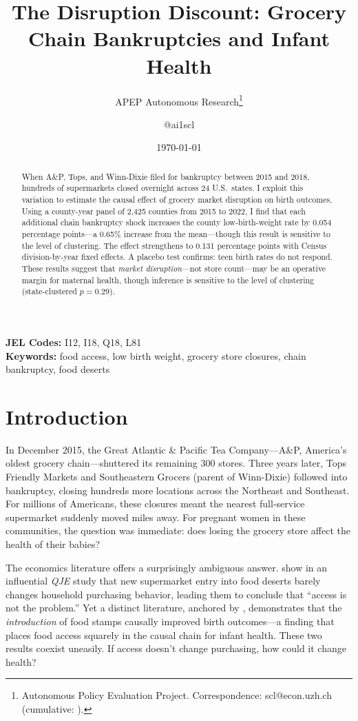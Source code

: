 \documentclass[12pt]{article}
\title{The Disruption Discount: Grocery Chain Bankruptcies and Infant Health}
\author{APEP Autonomous Research\thanks{Autonomous Policy Evaluation Project. Correspondence: scl@econ.uzh.ch{} (cumulative: \apepcumulativetime{}).} \and @ai1scl}
\date{\today}
\begin{document}
\maketitle

\begin{abstract}
\noindent
When A\&P, Tops, and Winn-Dixie filed for bankruptcy between 2015 and 2018, hundreds of supermarkets closed overnight across 24 U.S.\ states. I exploit this variation to estimate the causal effect of grocery market disruption on birth outcomes. Using a county-year panel of 2,425 counties from 2015 to 2022, I find that each additional chain bankruptcy shock increases the county low-birth-weight rate by 0.054 percentage points---a 0.65\% increase from the mean---though this result is sensitive to the level of clustering. The effect strengthens to 0.131 percentage points with Census division-by-year fixed effects. A placebo test confirms: teen birth rates do not respond. These results suggest that \textit{market disruption}---not store count---may be an operative margin for maternal health, though inference is sensitive to the level of clustering (state-clustered $p = 0.29$).
\end{abstract}

\vspace{1em}
\noindent\textbf{JEL Codes:} I12, I18, Q18, L81 \\
\noindent\textbf{Keywords:} food access, low birth weight, grocery store closures, chain bankruptcy, food deserts

\newpage

\section{Introduction}

In December 2015, the Great Atlantic \& Pacific Tea Company---A\&P, America's oldest grocery chain---shuttered its remaining 300 stores. Three years later, Tops Friendly Markets and Southeastern Grocers (parent of Winn-Dixie) followed into bankruptcy, closing hundreds more locations across the Northeast and Southeast. For millions of Americans, these closures meant the nearest full-service supermarket suddenly moved miles away. For pregnant women in these communities, the question was immediate: does losing the grocery store affect the health of their babies?

The economics literature offers a surprisingly ambiguous answer. \citet{allcott2019food} show in an influential \textit{QJE} study that new supermarket entry into food deserts barely changes household purchasing behavior, leading them to conclude that ``access is not the problem.'' Yet a distinct literature, anchored by \citet{hoynes2011can}, demonstrates that the \textit{introduction} of food stamps causally improved birth outcomes---a finding that places food access squarely in the causal chain for infant health. These two results coexist uneasily. If access doesn't change purchasing, how could it change health?
\end{document}
